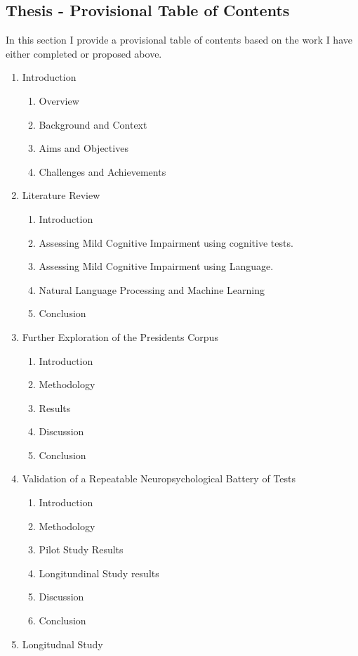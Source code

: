 \documentclass[12pt, twoside, a4paper]{article}
\begin{document}
{\subsection{Thesis - Provisional Table of Contents}
In this section I provide a provisional table of contents based on the work I have either completed or proposed above.
\begin{enumerate}
	\item Introduction
	\begin{enumerate}
		\item Overview
		\item Background and Context
		\item Aims and Objectives
		\item Challenges and Achievements
	\end{enumerate}
	\item Literature Review
	\begin{enumerate}
		\item Introduction
		\item Assessing Mild Cognitive Impairment using cognitive tests.
		\item Assessing Mild Cognitive Impairment using Language.
		\item Natural Language Processing and Machine Learning
		\item Conclusion
	\end{enumerate}
	\item Further Exploration of the Presidents Corpus
	\begin{enumerate}
		\item Introduction
		\item Methodology
		\item Results
		\item Discussion
		\item Conclusion
	\end{enumerate}
	\item Validation of a Repeatable Neuropsychological Battery of Tests
	\begin{enumerate}
		\item Introduction
		\item Methodology
		\item Pilot Study Results
		\item Longitundinal Study results
		\item Discussion
		\item Conclusion
	\end{enumerate}
	\item Longitudnal Study

\end{enumerate}}
\end{document}
